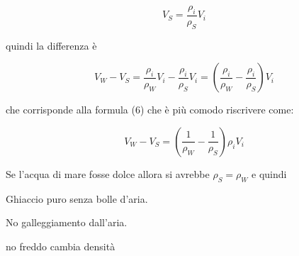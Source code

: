 \documentclass[a4paper]{article}
\begin{document}
\[V_S=\frac{\rho_i}{\rho_S}V_i\]

quindi la differenza è

\[V_W-V_S=\frac{\rho_i}{\rho_W}V_i-\frac{\rho_i}{\rho_S}V_i=(\frac{\rho_i}{\rho_W}-\frac{\rho_i}{\rho_S})V_i\]

che corrisponde alla formula (6) che è più comodo riscrivere come:

\[V_W-V_S=(\frac{1}{\rho_W}-\frac{1}{\rho_S})\rho_i V_i\]



Se l'acqua di mare fosse dolce allora si avrebbe $\rho_S=\rho_W$ e quindi


Ghiaccio puro senza bolle d'aria.

No galleggiamento dall'aria.

no freddo cambia densità









\begin{small}
 
\end{small}
\end{document}
